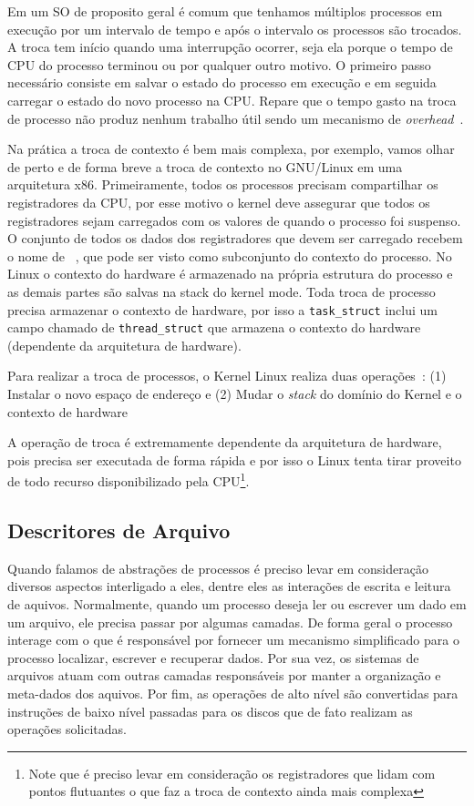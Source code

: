 Em um SO de proposito geral é comum que tenhamos múltiplos processos em
execução por um intervalo de tempo e após o intervalo os processos são
trocados. A troca tem início quando uma interrupção ocorrer, seja ela porque o
tempo de CPU do processo terminou ou por qualquer outro motivo. O primeiro
passo necessário consiste em salvar o estado do processo em execução e em
seguida carregar o estado do novo processo na CPU. Repare que o tempo gasto na
troca de processo não produz nenhum trabalho útil sendo um mecanismo de
\textit{overhead}~\citep{silberschatz}.

Na prática a troca de contexto é bem mais complexa, por exemplo, vamos olhar de
perto e de forma breve a troca de contexto no GNU/Linux em uma arquitetura x86.
Primeiramente, todos os processos precisam compartilhar os registradores da
CPU, por esse motivo o kernel deve assegurar que todos os registradores sejam
carregados com os valores de quando o processo foi suspenso. O conjunto de
todos os dados dos registradores que devem ser carregado recebem o nome de
~\citep{entendendo_kernel}, que pode ser
visto como subconjunto do contexto do processo. No Linux o contexto do hardware
é armazenado na própria estrutura do processo e as demais partes são salvas na
stack do kernel mode. Toda troca de processo precisa armazenar o contexto de
hardware, por isso a \texttt{task\_struct} inclui um campo chamado de
\texttt{thread\_struct} que armazena o contexto do hardware (dependente da
arquitetura de hardware).

Para realizar a troca de processos, o Kernel Linux realiza duas
operações~\citep{entendendo_kernel}: (1) Instalar o novo espaço de endereço e
(2) Mudar o \emph{stack} do domínio do Kernel e o contexto de hardware

A operação de troca é extremamente dependente da arquitetura de hardware, pois
precisa ser executada de forma rápida e por isso o Linux tenta tirar proveito
de todo recurso disponibilizado pela CPU\footnote{Note que é preciso levar em
consideração os registradores que lidam com pontos flutuantes o que faz a troca
de contexto ainda mais complexa}.

\subsection{Descritores de Arquivo}

Quando falamos de abstrações de processos é preciso levar em consideração
diversos aspectos interligado a eles, dentre eles as interações de escrita e
leitura de aquivos. Normalmente, quando um processo deseja ler ou escrever um
dado em um arquivo, ele precisa passar por algumas camadas. De forma geral o
processo interage com o  que é responsável
por fornecer um mecanismo simplificado para o processo localizar, escrever e
recuperar dados. Por sua vez, os sistemas de arquivos atuam com outras camadas
responsáveis por manter a organização e meta-dados dos aquivos. Por fim,
as operações de alto nível são convertidas para instruções de baixo nível
passadas para os discos que de fato realizam as operações solicitadas.

